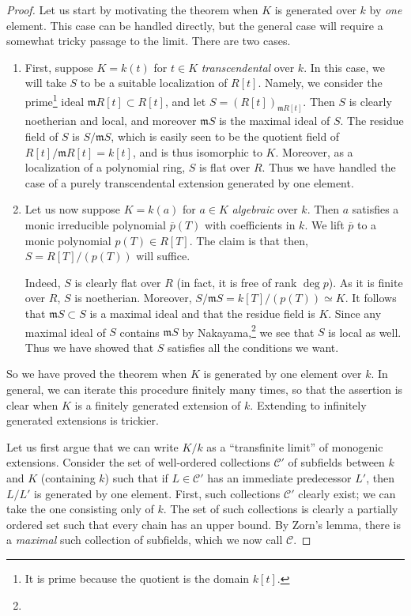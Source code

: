 \begin{proof} 
Let us start by motivating the theorem when $K$ is generated over $k$ by
\emph{one} element. 
This case can be handled directly, but the general case will require a
somewhat tricky passage to the limit.
There are two cases.

\begin{enumerate}
\item  
First, suppose $K = k(t)$ for $t \in K$ \emph{transcendental} over $k$. In
this case, we will take $S$ to be a suitable localization of $R[t]$. Namely,
we consider the prime\footnote{It is prime because the quotient is the domain
$k[t]$.} ideal $\mathfrak{m} R[t] \subset R[t]$, and let
$S = (R[t])_{\mathfrak{m} R[t]}$. 
Then $S$ is clearly noetherian and local, and moreover $\mathfrak{m}S$ is the
maximal ideal of $S$. The residue field of $S$ is $S/\mathfrak{m}S $, which is
easily seen to be the quotient field of $R[t]/\mathfrak{m}R[t] = k[t]$, and is
thus isomorphic to $K$. Moreover, as a localization of a polynomial ring, $S$
is flat over $R$.
Thus we have handled the case of a purely transcendental extension generated
by one element.

\item 
Let us now suppose $K = k(a)$ for $a \in K$ \emph{algebraic} over $k$. Then
$a$ satisfies a monic irreducible polynomial $\overline{p}(T)$ with coefficients in $k$.
We lift $\overline{p}$ to a monic polynomial $p(T) \in R[T]$. The claim is
that then, $S = R[T]/(p(T))$ will suffice.

Indeed, $S$ is clearly flat over $R$ (in fact, it is free of rank $\deg p$).
As it is finite over $R$, $S$ is noetherian. Moreover, $S/\mathfrak{m}S = k[T]/
(p(T)) \simeq K$. It follows that $\mathfrak{m}S \subset S$ is a maximal ideal
and that the residue field is $K$. Since any maximal ideal of $S$ contains
$\mathfrak{m}S$ by Nakayama,\footnote{} we see that $S$
is local as well. Thus we have showed that $S$ satisfies all the conditions we
want.
\end{enumerate}

So we have proved the theorem when $K$ is generated by one element over $k$.
In general, we can iterate this procedure finitely many times, so that the
assertion is clear when $K$ is a finitely generated extension of $k$.
Extending to infinitely generated extensions is trickier.

Let us first argue that we can write $K/k$ as a ``transfinite limit'' of
monogenic extensions. Consider the set of   well-ordered collections
$\mathcal{C}'$ of subfields between $k$ and $K$ (containing $k$) such that if $L \in
\mathcal{C}'$ has an immediate predecessor $L'$, then $L/L'$ is generated by
one element. First, such collections $\mathcal{C}'$ clearly exist; we can take
the one consisting only of $k$. The set of such collections is clearly a
partially ordered set such that every chain has an upper bound. 
By Zorn's lemma, there is a \emph{maximal} such collection of subfields, which
we now call $\mathcal{C}$.


\end{proof}
